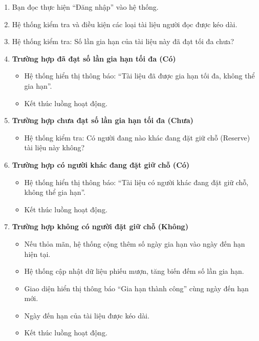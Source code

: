 \begin{enumerate}
    \item Bạn đọc thực hiện ``Đăng nhập'' vào hệ thống.
    
    \item Hệ thống kiểm tra và điều kiện các loại tài liệu người đọc được kéo dài.
    
    \item Hệ thống kiểm tra: Số lần gia hạn của tài liệu này đã đạt tối đa chưa?

    \item \textbf{Trường hợp đã đạt số lần gia hạn tối đa (Có)}
    \begin{itemize}
        \item Hệ thống hiển thị thông báo: ``Tài liệu đã được gia hạn tối đa, không thể gia hạn''.
        \item Kết thúc luồng hoạt động.
    \end{itemize}

    \item \textbf{Trường hợp chưa đạt số lần gia hạn tối đa (Chưa)}
    \begin{itemize}
        \item Hệ thống kiểm tra: Có người đang nào khác đang đặt giữ chỗ (Reserve) tài liệu này không?
    \end{itemize}

    \item \textbf{Trường hợp có người khác đang đặt giữ chỗ (Có)}
    \begin{itemize}
        \item Hệ thống hiển thị thông báo: ``Tài liệu có người khác đang đặt giữ chỗ, không thể gia hạn''.
        \item Kết thúc luồng hoạt động.
    \end{itemize}

    \item \textbf{Trường hợp không có người đặt giữ chỗ (Không)}
    \begin{itemize}
        \item Nếu thỏa mãn, hệ thống cộng thêm số ngày gia hạn vào ngày đến hạn hiện tại.
        
        \item Hệ thống cập nhật dữ liệu phiếu mượn, tăng biến đếm số lần gia hạn.
        
        \item Giao diện hiển thị thông báo ``Gia hạn thành công'' cùng ngày đến hạn mới.
        
        \item Ngày đến hạn của tài liệu được kéo dài.
        
        \item Kết thúc luồng hoạt động.
    \end{itemize}

\end{enumerate}

